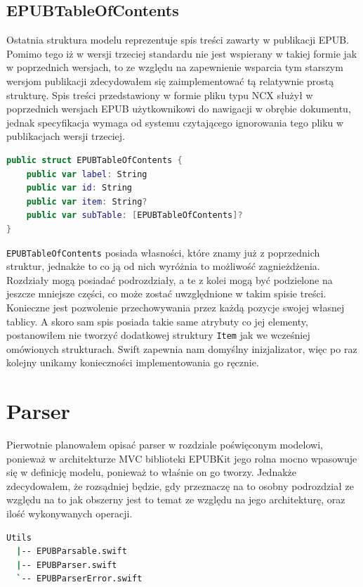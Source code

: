 \subsection{EPUBTableOfContents}

Ostatnia struktura modelu reprezentuje spis treści zawarty w publikacji EPUB. Pomimo tego iż w wersji trzeciej standardu nie jest wspierany w takiej formie jak w poprzednich wersjach, to ze względu na zapewnienie wsparcia tym starszym wersjom publikacji zdecydowałem się zaimplementować tą relatywnie prostą strukturę. Spis treści przedstawiony w formie pliku typu NCX służył w poprzednich wersjach EPUB użytkownikowi do nawigacji w obrębie dokumentu, jednak specyfikacja wymaga od systemu czytającego ignorowania tego pliku w publikacjach wersji trzeciej.

\begin{lstlisting}[caption={Struktura EPUBTableOfContents}, language=swift,label=dasdaasdsa]
public struct EPUBTableOfContents {
    public var label: String
    public var id: String
    public var item: String?
    public var subTable: [EPUBTableOfContents]?
}
\end{lstlisting}

\texttt{EPUBTableOfContents} posiada własności, które znamy już z poprzednich struktur, jednakże to co ją od nich wyróżnia to możliwość zagnieżdżenia. Rozdziały mogą posiadać podrozdziały, a te z kolei mogą być podzielone na jeszcze mniejsze części, co może zostać uwzględnione w takim spisie treści. Konieczne jest pozwolenie przechowywania przez każdą pozycje swojej własnej tablicy. A skoro sam spis posiada takie same atrybuty co jej elementy, postanowiłem nie tworzyć dodatkowej struktury \texttt{Item} jak we wcześniej omówionych strukturach. Swift zapewnia nam domyślny inizjalizator, więc po raz kolejny unikamy konieczności implementowania go ręcznie.

\section{Parser}

Pierwotnie planowałem opisać parser w rozdziale poświęconym modelowi, ponieważ w architekturze MVC biblioteki EPUBKit jego rolna mocno wpasowuje się w definicję modelu, ponieważ to właśnie on go tworzy. Jednakże zdecydowałem, że rozsądniej będzie, gdy przeznaczę na to osobny podrozdział ze względu na to jak obszerny jest to temat ze względu na jego architekturę, oraz ilość wykonywanych operacji.

\begin{lstlisting}[caption={Struktura folderu narzędzi służących modelowi EPUBKit}, language=bash,label=ertyuio]
  Utils
  |-- EPUBParsable.swift
  |-- EPUBParser.swift
  `-- EPUBParserError.swift
\end{lstlisting}

